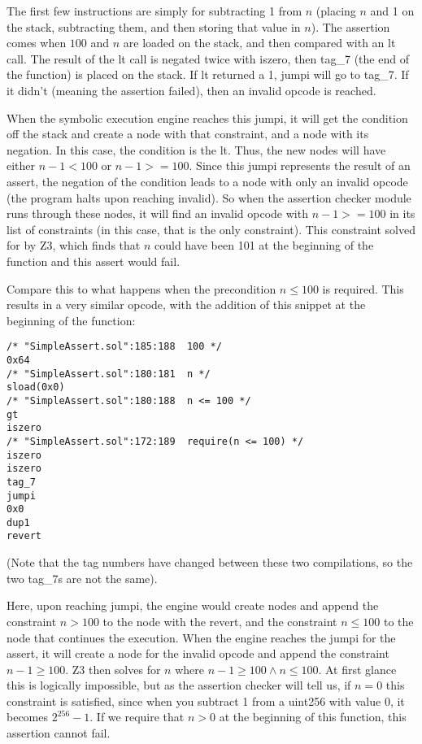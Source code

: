 \documentclass[acmsmall]{acmart}\settopmatter{}
\begin{document}
The first few instructions are simply for subtracting 1 from $n$ (placing $n$ and 1 on the stack, subtracting them, and then storing that value in $n$). The assertion comes when $100$ and $n$ are loaded on the stack, and then compared with an lt call. The result of the lt call is negated twice with iszero, then tag\_7 (the end of the function) is placed on the stack. If lt returned a 1, jumpi will go to tag\_7. If it didn't (meaning the assertion failed), then an invalid opcode is reached.

When the symbolic execution engine reaches this jumpi, it will get the condition off the stack and create a node with that constraint, and a node with its negation. In this case, the condition is the lt. Thus, the new nodes will have either $n - 1 < 100$ or $n - 1 >= 100$. Since this jumpi represents the result of an assert, the negation of the condition leads to a node with only an invalid opcode (the program halts upon reaching invalid). So when the assertion checker module runs through these nodes, it will find an invalid opcode with $n - 1 >= 100$ in its list of constraints (in this case, that is the only constraint). This constraint solved for by Z3, which finds that $n$ could have been 101 at the beginning of the function and this assert would fail.

Compare this to what happens when the precondition $n \leq 100$ is required. This results in a very similar opcode, with the addition of this snippet at the beginning of the function:

\begin{verbatim}
/* "SimpleAssert.sol":185:188  100 */
0x64
/* "SimpleAssert.sol":180:181  n */
sload(0x0)
/* "SimpleAssert.sol":180:188  n <= 100 */
gt
iszero
/* "SimpleAssert.sol":172:189  require(n <= 100) */
iszero
iszero
tag_7
jumpi
0x0
dup1
revert
\end{verbatim}

(Note that the tag numbers have changed between these two compilations, so the two tag\_7s are not the same).

Here, upon reaching jumpi, the engine would create nodes and append the constraint $n > 100$ to the node with the revert, and the constraint $n \leq 100$ to the node that continues the execution. When the engine reaches the jumpi for the assert, it will create a node for the invalid opcode and append the constraint $n - 1 \geq 100$. Z3 then solves for $n$ where $n - 1 \geq 100 \land n \leq 100$. At first glance this is logically impossible, but as the assertion checker will tell us, if $n = 0$ this constraint is satisfied, since when you subtract 1 from a uint256 with value 0, it becomes $2^{256} - 1$. If we require that $n > 0$ at the beginning of this function, this assertion cannot fail.
\end{document}
